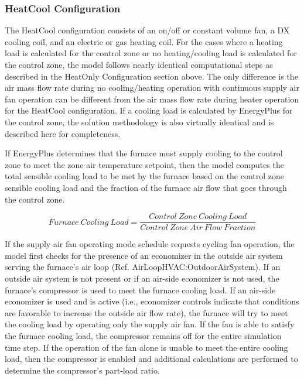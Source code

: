 \subsubsection{HeatCool Configuration}\label{heatcool-configuration}

The HeatCool configuration consists of an on/off or constant volume fan, a DX cooling coil, and an electric or gas heating coil. For the cases where a heating load is calculated for the control zone or no heating/cooling load is calculated for the control zone, the model follows nearly identical computational steps as described in the HeatOnly Configuration section above. The only difference is the air mass flow rate during no cooling/heating operation with continuous supply air fan operation can be different from the air mass flow rate during heater operation for the HeatCool configuration. If a cooling load is calculated by EnergyPlus for the control zone, the solution methodology is also virtually identical and is described here for completeness.

If EnergyPlus determines that the furnace must supply cooling to the control zone to meet the zone air temperature setpoint, then the model computes the total sensible cooling load to be met by the furnace based on the control zone sensible cooling load and the fraction of the furnace air flow that goes through the control zone.

\begin{equation}
Furnace~Cooling~Load = \frac{{Control~Zone~Cooling~Load}}{{Control~Zone~Air~Flow~Fraction}}
\end{equation}

If the supply air fan operating mode schedule requests cycling fan operation, the model first checks for the presence of an economizer in the outside air system serving the furnace's air loop (Ref. AirLoopHVAC:OutdoorAirSystem). If an outside air system is not present or if an air-side economizer is not used, the furnace's compressor is used to meet the furnace cooling load. If an air-side economizer is used and is active (i.e., economizer controls indicate that conditions are favorable to increase the outside air flow rate), the furnace will try to meet the cooling load by operating only the supply air fan. If the fan is able to satisfy the furnace cooling load, the compressor remains off for the entire simulation time step. If the operation of the fan alone is unable to meet the entire cooling load, then the compressor is enabled and additional calculations are performed to determine the compressor's part-load ratio.

